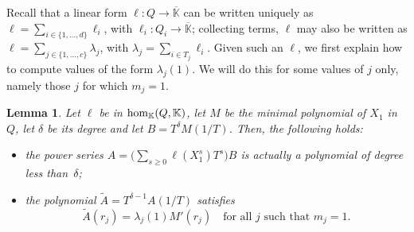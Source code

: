 \documentclass[12pt]{article}
\def\K {\ensuremath{\mathbb{K}}}
\def\Kbar {{\ensuremath{\overline{\mathbb{K}}}}}
\newtheorem{Lemma}{Lemma}
\begin{document}
Recall that a linear form $\ell: Q \to \Kbar$ can be written uniquely
as $\ell=\sum_{i\in \{1,\dots,d\}} \ell_i$, with $\ell_i:Q_i \to
\Kbar$; collecting terms, $\ell$ may also be written as $\ell=\sum_{j
  \in \{1,\dots,c\}} \lambda_j$, with $\lambda_j=\sum_{i \in T_j}
\ell_i$.  Given such an $\ell$, we first explain how to compute values
of the form $\lambda_j(1)$. We will do this for some values of $j$
only, namely those $j$ for which $m_j=1$.

\begin{Lemma}\label{lemma:valuelambda}
  Let $\ell$ be in ${\rm hom}_\K(Q,\K)$, let $M$ be the minimal
  polynomial of $X_1$ in $Q$, let $\delta$ be its degree and 
  let $B=T^{\delta}M(1/T)$. Then, the following holds:
  \begin{itemize}
  \item the power series $A = \Big(\sum_{s \ge 0}
    \ell(X_1^s)T^s\Big)B$ is actually a polynomial of degree less than~$\delta$;
  \item the polynomial $\tilde A = T^{\delta-1} A(1/T)$ satisfies
    $$\tilde A(r_j) = \lambda_j(1) M'(r_j) \quad \text{for all $j$ such that $m_j=1$.}$$
  \end{itemize}
\end{Lemma}
\end{document}
